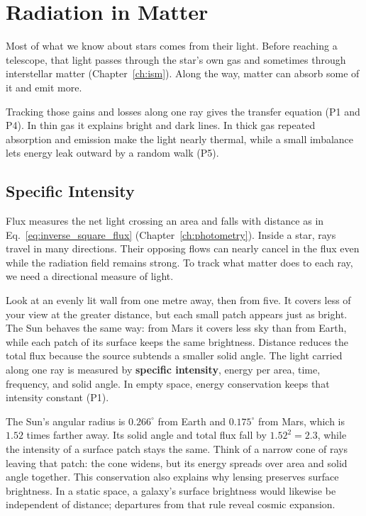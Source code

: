 \chapter{Radiation in Matter}
\label{ch:radiation}

Most of what we know about stars comes from their light. Before reaching a telescope, that light passes through the star's own gas and sometimes through interstellar matter (Chapter~\ref{ch:ism}). Along the way, matter can absorb some of it and emit more.

Tracking those gains and losses along one ray gives the transfer equation (P1 and P4). In thin gas it explains bright and dark lines. In thick gas repeated absorption and emission make the light nearly thermal, while a small imbalance lets energy leak outward by a random walk (P5).

\section{Specific Intensity}
\label{rad:sec:intensity}

Flux measures the net light crossing an area and falls with distance as in Eq.~\eqref{eq:inverse_square_flux} (Chapter~\ref{ch:photometry}). Inside a star, rays travel in many directions. Their opposing flows can nearly cancel in the flux even while the radiation field remains strong. To track what matter does to each ray, we need a directional measure of light.

Look at an evenly lit wall from one metre away, then from five. It covers less of your view at the greater distance, but each small patch appears just as bright. The Sun behaves the same way: from Mars it covers less sky than from Earth, while each patch of its surface keeps the same brightness. Distance reduces the total flux because the source subtends a smaller solid angle. The light carried along one ray is measured by \textbf{specific intensity}, energy per area, time, frequency, and solid angle. In empty space, energy conservation keeps that intensity constant (P1).

The Sun's angular radius is $0.266^\circ$ from Earth and $0.175^\circ$ from Mars, which is $1.52$ times farther away. Its solid angle and total flux fall by $1.52^2=2.3$, while the intensity of a surface patch stays the same. Think of a narrow cone of rays leaving that patch: the cone widens, but its energy spreads over area and solid angle together. This conservation also explains why lensing preserves surface brightness. In a static space, a galaxy's surface brightness would likewise be independent of distance; departures from that rule reveal cosmic expansion.


